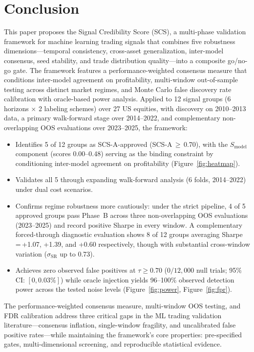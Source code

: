 \documentclass[12pt,a4paper]{article}
\begin{document}
\section{Conclusion}
\label{sec:conclusion}

This paper proposes the Signal Credibility Score (SCS), a multi-phase validation framework for machine learning trading signals that combines five robustness dimensions---temporal consistency, cross-asset generalization, inter-model consensus, seed stability, and trade distribution quality---into a composite go/no-go gate. The framework features a performance-weighted consensus measure that conditions inter-model agreement on profitability, multi-window out-of-sample testing across distinct market regimes, and Monte Carlo false discovery rate calibration with oracle-based power analysis. Applied to 12 signal groups (6 horizons $\times$ 2 labeling schemes) over 27 US equities, with discovery on 2010--2013 data, a primary walk-forward stage over 2014--2022, and complementary non-overlapping OOS evaluations over 2023--2025, the framework:

\begin{itemize}
  \item Identifies 5 of 12 groups as SCS-A-approved (SCS-A\,$\geq$\,0.70), with the $S_{\text{model}}$ component (scores 0.00--0.48) serving as the binding constraint by conditioning inter-model agreement on profitability (Figure~\ref{fig:heatmap}).
  \item Validates all 5 through expanding walk-forward analysis (6 folds, 2014--2022) under dual cost scenarios.
  \item Confirms regime robustness more cautiously: under the strict pipeline, 4 of 5 approved groups pass Phase~B across three non-overlapping OOS evaluations (2023--2025) and record positive Sharpe in every window. A complementary forced-through diagnostic evaluation shows 8 of 12 groups averaging Sharpe\,=\,+1.07, +1.39, and +0.60 respectively, though with substantial cross-window variation ($\sigma_{\text{SR}}$ up to 0.73).
  \item Achieves zero observed false positives at $\tau \geq 0.70$ ($0/12{,}000$ null trials; 95\% CI: $[0, 0.03\%]$) while oracle injection yields 96--100\% observed detection power across the tested noise levels (Figure~\ref{fig:power}, Figure~\ref{fig:fpr}).
\end{itemize}

The performance-weighted consensus measure, multi-window OOS testing, and FDR calibration address three critical gaps in the ML trading validation literature---consensus inflation, single-window fragility, and uncalibrated false positive rates---while maintaining the framework's core properties: pre-specified gates, multi-dimensional screening, and reproducible statistical evidence.
\end{document}
